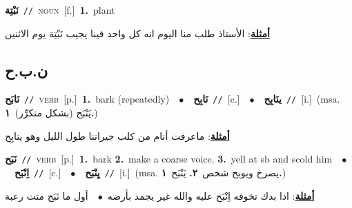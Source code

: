 \documentclass[10pt,a4paper,twoside]{article} %
\begin{document}
\begin{multicols}{2}
{\setlength\topsep{0pt}\textbf{\foreignlanguage{arabic}{نَبْتِة}}\ {\color{gray}\texttt{//}\color{black}}\ \textsc{noun}\ [f.]\ \textbf{1.}~plant\  \begin{flushright}\color{gray}\foreignlanguage{arabic}{\textbf{\underline{\foreignlanguage{arabic}{أمثلة}}}: الأستاذ طلب منا اليوم انه كل واحد فينا يجيب نَبْتِة يوم الاثنين}\end{flushright}\color{black}} \vspace{2mm}

\vspace{-3mm}
\subsection*{\color{blue}\foreignlanguage{arabic}{ن.ب.ح}\color{blue}{}} 

{\setlength\topsep{0pt}\textbf{\foreignlanguage{arabic}{نَابَح}}\ {\color{gray}\texttt{//}\color{black}}\ \textsc{verb}\ [p.]\ \textbf{1.}~bark (repeatedly)\ \ $\bullet$\ \ \setlength\topsep{0pt}\textbf{\foreignlanguage{arabic}{نَابِح}}\ {\color{gray}\texttt{//}\color{black}}\ [c.]\ \ $\bullet$\ \ \setlength\topsep{0pt}\textbf{\foreignlanguage{arabic}{ينَابِح}}\ {\color{gray}\texttt{//}\color{black}}\ [i.]\ \color{gray}(msa. \foreignlanguage{arabic}{يَنْبَح (بشكل متكرِّر)}~\foreignlanguage{arabic}{\textbf{١.}})\color{black}\  \begin{flushright}\color{gray}\foreignlanguage{arabic}{\textbf{\underline{\foreignlanguage{arabic}{أمثلة}}}: ماعرفت أنام من كلب جيراننا طول الليل وهو ينابِح}\end{flushright}\color{black}} \vspace{2mm}

{\setlength\topsep{0pt}\textbf{\foreignlanguage{arabic}{نَبَح}}\ {\color{gray}\texttt{//}\color{black}}\ \textsc{verb}\ [p.]\ \textbf{1.}~bark  \textbf{2.}~make a coarse voice.  \textbf{3.}~yell at sb and scold him\ \ $\bullet$\ \ \setlength\topsep{0pt}\textbf{\foreignlanguage{arabic}{اِنْبَح}}\ {\color{gray}\texttt{//}\color{black}}\ [c.]\ \ $\bullet$\ \ \setlength\topsep{0pt}\textbf{\foreignlanguage{arabic}{يِنْبَح}}\ {\color{gray}\texttt{//}\color{black}}\ [i.]\ \color{gray}(msa. \foreignlanguage{arabic}{يصرخ ويوبخ شخص}~\foreignlanguage{arabic}{\textbf{٢.}}  \foreignlanguage{arabic}{يَنْبَح}~\foreignlanguage{arabic}{\textbf{١.}})\color{black}\  \begin{flushright}\color{gray}\foreignlanguage{arabic}{\textbf{\underline{\foreignlanguage{arabic}{أمثلة}}}: اذا بدك تخوفه اِنْبَح عليه والله غير يجمد بأرضه\ $\bullet$\ \  أول ما نَبَح متت رعبة}\end{flushright}\color{black}} \vspace{2mm}


\end{multicols}
\end{document}
